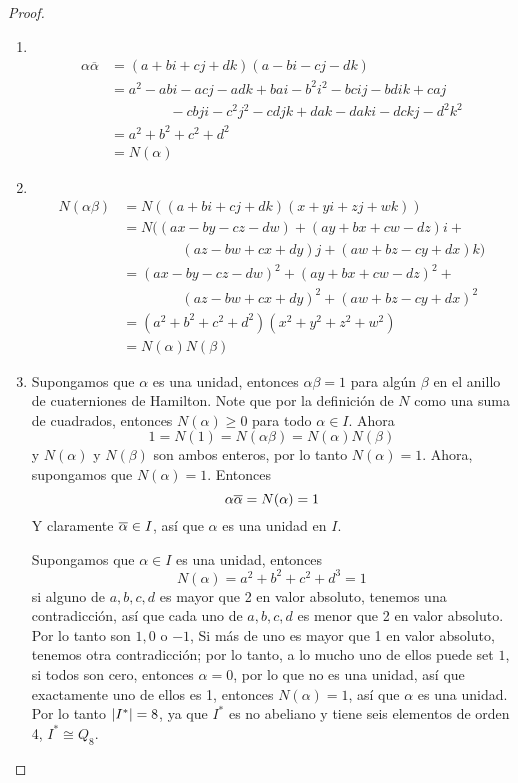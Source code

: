\documentclass{amsart}
\begin{document}
\begin{proof}
    \,
    \begin{enumerate}
        \item \, 
        \begin{align*}
            \alpha \overline{\alpha} &= (a+bi+cj+dk)(a-bi-cj-dk) \\
            &= a^2 - abi - acj - adk + bai - b^2i^2 - bcij - bdik + caj \\
            &\ \qquad \qquad - cbji - c^2j^2 - cdjk + dak - daki - dckj - d^2k^2 \\
            &= a^2+b^2+c^2+d^2 \\ 
            &= N(\alpha)
        \end{align*}
        \item \,
        \begin{align*}
            N(\alpha\beta) &= N((a+bi+cj+dk)(x+yi+zj+wk)) \\
            &= N((ax-by-cz-dw) +(ay+bx+cw-dz)i + \\
            &\ \qquad \qquad (az-bw + cx+dy)j +(aw+bz-cy+dx)k) \\
            &= (ax-by-cz-dw)^2 + (ay+bx+cw-dz)^2 + \\
            &\ \qquad \qquad (az-bw+cx+dy)^2  +(aw+bz-cy+dx)^2\\ 
            &= (a^2 + b^2 + c^2 + d^2)(x^2 + y^2 + z^2 + w^2)\\ 
            &= N(\alpha)N(\beta)
        \end{align*}
        
        \item Supongamos que $\alpha$ es una unidad, entonces $\alpha\beta = 1$ para algún $\beta$ en el anillo  de cuaterniones de Hamilton. Note que por la definición de $N$ como una suma de cuadrados, entonces $N(\alpha) \geq 0$ para todo $\alpha \in I$. Ahora
        $$ 1 = N(1) = N(\alpha\beta) = N(\alpha)N(\beta) $$
        y $N(\alpha)$ y $N(\beta)$ son ambos enteros, por lo tanto $N(\alpha) = 1$. Ahora, supongamos que $N(\alpha) = 1$. Entonces
        $$ \alpha \overline{\alpha} = N(\alpha) = 1$$
        Y claramente $\overline{\alpha} \in I$, así que $\alpha$ es una unidad en $I$.

        Supongamos que $\alpha \in I$ es una unidad, entonces
        $$ N(\alpha) = a^2 + b^2 + c^2 + d^3 = 1$$
        si alguno de $a, b, c, d$ es mayor que 2 en valor absoluto, tenemos una contradicción, así que cada uno de $a, b, c, d$ es menor que 2 en valor absoluto. Por lo tanto son $1, 0$ o  $-1$, Si más de uno es mayor que 1 en valor absoluto, tenemos otra contradicción; por lo tanto, a lo mucho uno de ellos puede set $1$, si todos son cero, entonces $\alpha = 0$, por lo que no es una unidad, así que exactamente uno de ellos es 1, entonces $N(\alpha) = 1$, así que $\alpha$ es una unidad. Por lo tanto $\left\lvert I^* \right\rvert = 8$, ya que $I^*$ es no abeliano y tiene seis elementos de orden 4, $I^* \cong Q_8$.
    \end{enumerate}
\end{proof}
\end{document}
